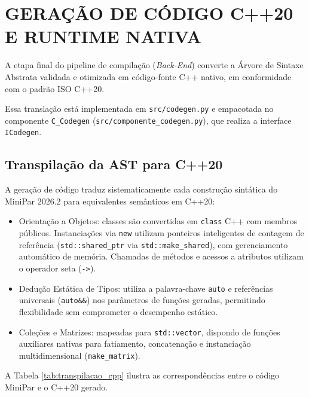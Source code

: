 \chapter{GERAÇÃO DE CÓDIGO C++20 E RUNTIME NATIVA}

A etapa final do pipeline de compilação (\textit{Back-End}) converte a Árvore de Sintaxe Abstrata validada e otimizada em código-fonte C++ nativo, em conformidade com o padrão ISO C++20. 

Essa translação está implementada em \texttt{src/codegen.py} e empacotada no componente \texttt{C\_Codegen} (\texttt{src/componente\_codegen.py}), que realiza a interface \texttt{ICodegen}.

\section{Transpilação da AST para C++20}

A geração de código traduz sistematicamente cada construção sintática do MiniPar 2026.2 para equivalentes semânticos em C++20:
\begin{itemize}
    \item Orientação a Objetos: classes são convertidas em \texttt{class} C++ com membros públicos. Instanciações via \texttt{new} utilizam ponteiros inteligentes de contagem de referência (\texttt{std::shared\_ptr} via \texttt{std::make\_shared}), com gerenciamento automático de memória. Chamadas de métodos e acessos a atributos utilizam o operador seta (\texttt{->}).
    \item Dedução Estática de Tipos: utiliza a palavra-chave \texttt{auto} e referências universais (\texttt{auto\&\&}) nos parâmetros de funções geradas, permitindo flexibilidade sem comprometer o desempenho estático.
    \item Coleções e Matrizes: mapeadas para \texttt{std::vector}, dispondo de funções auxiliares nativas para fatiamento, concatenação e instanciação multidimensional (\texttt{make\_matrix}).
\end{itemize}

A Tabela \ref{tab:transpilacao_cpp} ilustra as correspondências entre o código MiniPar e o C++20 gerado.

